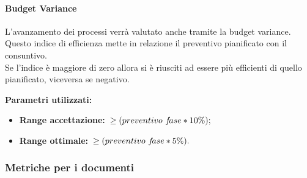 			\paragraph{Budget Variance}
			\label{sec:3.7.1.2}
				L'avanzamento dei processi verrà valutato anche tramite la budget variance. Questo indice di efficienza mette in relazione il preventivo pianificato con il consuntivo. \\
				Se l'indice è maggiore di zero allora si è riusciti ad essere più efficienti di quello pianificato, viceversa se negativo.
				
				\textbf{Parametri utilizzati:}
				\begin{itemize}
					\item \textbf{Range accettazione:}\ $\ge\-(preventivo\,\, f\!ase*10\%);$
					\item \textbf{Range ottimale:}\ $\ge\-(preventivo\,\, f\!ase*5\%).$
				\end{itemize}
		\subsubsection{Metriche per i documenti}
		\label{sec:3.7.2}
